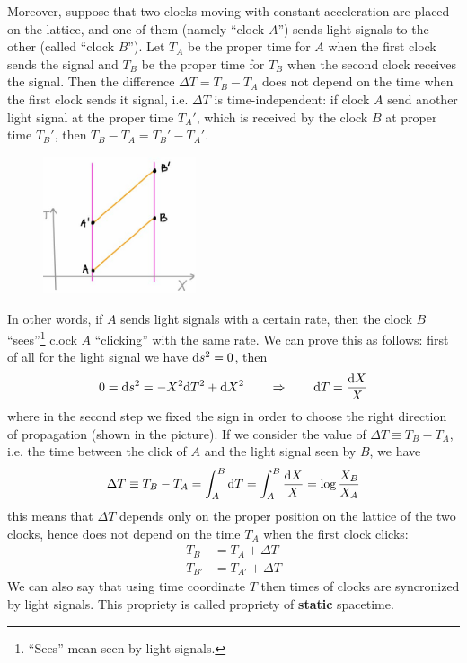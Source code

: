 \documentclass[../main/main.tex]{subfiles}
\begin{document}
Moreover, suppose that two clocks moving with constant acceleration are placed on the lattice, and one of them (namely ``clock $A$'') sends light signals to the other (called ``clock $B$''). Let $T_A$ be the proper time for $A$ when the first clock sends the signal and $T_B$ be the proper time for $T_B$ when the second clock receives the signal. Then the difference $\Delta T=T_B-T_A$ does not depend on the time when the first clock sends it signal, i.e. $\Delta T$ is time-independent: if clock $A$ send another light signal at the proper time $T_A'$, which is received by the clock $B$ at proper time $T_B'$, then $T_B-T_A=T_B'-T_A'$.
\begin{figure}[H]
\centering
\includegraphics[width=4.5cm]{../img/T-meaning-Rindler.jpg}
\end{figure}
\noindent In other words, if $A$ sends light signals with a certain rate, then the clock $B$ ``sees''\footnote{``Sees'' mean seen by light signals.} clock $A$ ``clicking'' with the same rate. We can prove this as follows: first of all for the light signal we have $\textup{d} s^2=0$, then
\[0=\textup{d} s^2=-X^2\textup{d} T^2+\textup{d} X^2\qquad\Rightarrow\qquad\textup{d} T=\frac{\textup{d} X}{X}\]
where in the second step we fixed the sign in order to choose the right direction of propagation (shown in the picture). If we consider the value of $\Delta T\equiv T_B-T_A$, i.e. the time between the click of $A$ and the light signal seen by $B$, we have
\[\Delta T\equiv T_B-T_A=\int_A^B\textup{d} T=\int_A^B\frac{\textup{d} X}{X}=\log\frac{X_B}{X_A}\] 
this means that $\Delta T$ depends only on the proper position on the lattice of the two clocks, hence does not depend on the time $T_A$ when the first clock clicks:
\begin{align*}
T_B&=T_A+\Delta T\\
T_{B'}&=T_{A'}+\Delta T
\end{align*}
We can also say that using time coordinate $T$ then times of clocks are syncronized by light signals.
This propriety is called propriety of \textbf{static} spacetime. 
\end{document}
